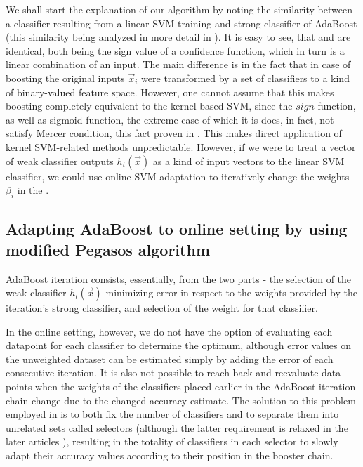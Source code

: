 We shall start the explanation of our algorithm by noting the similarity between a classifier resulting from a linear SVM training and strong classifier of AdaBoost (this similarity being analyzed in more detail in \cite{Boostsvm}). It is easy to see, that  and are identical, both being the sign value of a confidence function, which in turn is a linear combination of an input. The main difference is in the fact that in case of boosting the original inputs $\vec{x}_i$ were transformed by a set of classifiers to a kind of binary-valued feature space. However, one cannot assume that this makes boosting completely equivalent to the kernel-based SVM, since the $sign$ function, as well as sigmoid function, the extreme case of which it is does, in fact, not satisfy Mercer condition, this fact proven in \cite{smola2001}. This makes direct application of kernel SVM-related methods unpredictable. However, if we were to treat a vector of weak classifier outputs $h_t(\vec{x})$ as a kind of input vectors to the linear SVM classifier, we could use online SVM adaptation to iteratively change the weights $\beta_i$ in the  .


\subsection{Adapting AdaBoost to online setting by using modified Pegasos algorithm}

AdaBoost iteration consists, essentially, from the two parts - the selection of the weak classifier $h_t(\vec{x})$ minimizing error in respect to the weights provided by the iteration's strong classifier, and selection of the weight for that classifier. 

In the online setting, however, we do not have the option of evaluating each datapoint for each classifier to determine the optimum, although error values on the unweighted dataset can be estimated simply by adding the error of each consecutive iteration. It is also not possible to reach back and reevaluate data points when the weights of the classifiers placed earlier in the AdaBoost iteration chain change due to the changed accuracy estimate. The solution to this problem employed in \cite{OnlineBoost} is to both fix the number of classifiers and to separate them into unrelated sets called selectors (although the latter requirement is relaxed in the later articles \cite{grabner2009}), resulting in the totality of classifiers in each selector to slowly adapt their accuracy values according to their position in the booster chain.


